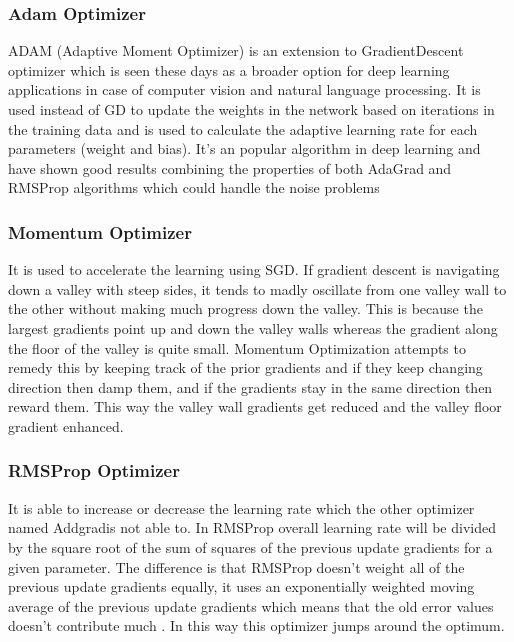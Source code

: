 \documentclass[12pt, a4paper]{report}
\begin{document}
\subsubsection{Adam Optimizer}\label{adam}
ADAM (Adaptive Moment Optimizer) is an extension to GradientDescent optimizer which is seen these days as a broader option for deep learning applications in case of computer vision and natural language processing. It is used instead of GD to update the weights in the network based on iterations in the training data and is used to calculate the adaptive learning rate for each parameters (weight and bias)\cite{OptimizerGeneral}. It’s an popular algorithm in deep learning and have shown good results combining the properties of both AdaGrad and RMSProp algorithms which could handle the noise problems\\ \par

\subsubsection{Momentum Optimizer}\label{momentum}
It is used to accelerate the learning using SGD. If gradient descent is navigating down a valley with steep sides, it tends to madly oscillate from one valley wall to the other without making much progress down the valley. This is because the largest gradients point up and down the valley walls whereas the gradient along the floor of the valley is quite small. Momentum Optimization attempts to remedy this by keeping track of the prior gradients and if they keep changing direction then damp them, and if the gradients stay in the same direction then reward them. This way the valley wall gradients get reduced and the valley floor gradient enhanced.\cite{momentum}\\ \par

\subsubsection{RMSProp Optimizer}\label{RMSProp}
It is able to increase or decrease the learning rate which the other optimizer named Addgradis not able to. In RMSProp overall learning rate will be divided by the square root of the sum of squares of the previous update gradients for a given parameter. The difference is that RMSProp doesn’t weight all of the previous update gradients equally, it uses an exponentially weighted moving average of the previous update gradients which means that the old error values doesn’t contribute much \cite{OptimizerGeneral}. In this way this optimizer jumps around the optimum.
\end{document}
